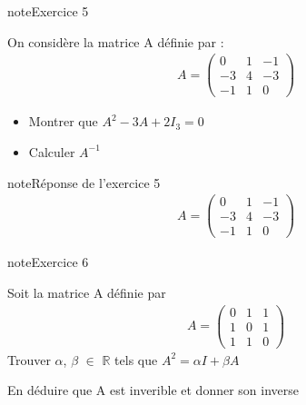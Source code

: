 \documentclass[letterpaper,10pt,french]{jupyterBook}
\begin{document}
\begin{sphinxadmonition}{note}{Exercice 5}

\sphinxAtStartPar
On considère la matrice A définie par :
\begin{equation*}
\begin{split}
A = \begin{pmatrix}
0 & 1 & -1 \\
-3 & 4 & -3  \\
-1 & 1 & 0 
\end{pmatrix}
\end{split}
\end{equation*}\begin{itemize}
\item {} 
\sphinxAtStartPar
Montrer que \(A^2-3A+2I_3 = 0\)

\item {} 
\sphinxAtStartPar
Calculer \(A^{-1}\)

\end{itemize}
\end{sphinxadmonition}

\begin{sphinxadmonition}{note}{Réponse de l’exercice 5}
\begin{equation*}
\begin{split}
A = \begin{pmatrix}
0 & 1 & -1 \\
-3 & 4 & -3  \\
-1 & 1 & 0 
\end{pmatrix}
\end{split}
\end{equation*}\end{sphinxadmonition}

\begin{sphinxadmonition}{note}{Exercice 6}

\sphinxAtStartPar
Soit la matrice A définie par
\begin{equation*}
\begin{split}
A = \begin{pmatrix}
0 & 1 & 1  \\
1 & 0 & 1  \\
1 & 1 & 0 
\end{pmatrix}
\end{split}
\end{equation*}
\sphinxhyphen{} Trouver \(\alpha\), \(\beta\) \(\in\) \(\mathbb{R}\) tels que \(A^2 = \alpha I + \beta A\)

\sphinxhyphen{} En déduire que A est inverible et donner son inverse
\end{sphinxadmonition}
\end{document}

